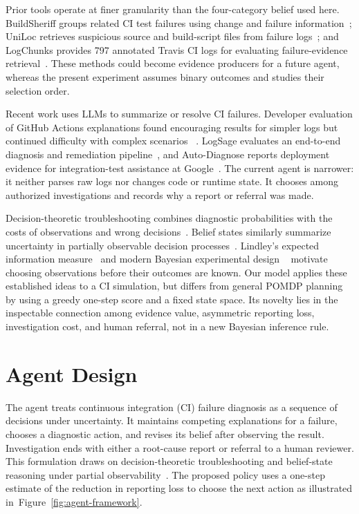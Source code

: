 \documentclass{article}
\begin{document}
Prior tools operate at finer granularity than the four-category belief used
here. BuildSheriff groups related CI test failures using change and failure
information~\cite{Zhang2022BuildSheriff}; UniLoc retrieves suspicious source
and build-script files from failure logs~\cite{Hassan2023UniLoc}; and LogChunks
provides 797 annotated Travis CI logs for evaluating failure-evidence
retrieval~\cite{Brandt2020LogChunks}. These methods could become evidence
producers for a future agent, whereas the present experiment assumes binary
outcomes and studies their selection order.

Recent work uses LLMs to summarize or resolve CI failures. Developer evaluation
of GitHub Actions explanations found encouraging results for simpler logs but
continued difficulty with complex scenarios
~\cite{ValenzuelaToledo2025GHAFailures}. LogSage evaluates an end-to-end
diagnosis and remediation pipeline~\cite{Xu2025LogSage}, and Auto-Diagnose
reports deployment evidence for integration-test assistance at
Google~\cite{Ziftci2026AutoDiagnose}. The current agent is narrower: it neither
parses raw logs nor changes code or runtime state. It chooses among authorized
investigations and records why a report or referral was made.

Decision-theoretic troubleshooting combines diagnostic probabilities with the
costs of observations and wrong decisions~\cite{Heckerman1995Troubleshooting}.
Belief states similarly summarize uncertainty in partially observable
decision processes~\cite{Kaelbling1998POMDP}. Lindley's expected information
measure~\cite{Lindley1956Information} and modern Bayesian experimental design
~\cite{Rainforth2024ExperimentalDesign} motivate choosing observations before
their outcomes are known. Our model applies these established ideas to a CI
simulation, but differs from general POMDP planning by using a greedy one-step
score and a fixed state space. Its novelty lies in the inspectable connection
among evidence value, asymmetric reporting loss, investigation cost, and
human referral, not in a new Bayesian inference rule.

\section{Agent Design}
\label{sec:agent_design}

The agent treats continuous integration (CI) failure diagnosis as a sequence
of decisions under uncertainty. It maintains competing explanations for a
failure, chooses a diagnostic action, and revises its belief after observing
the result. Investigation ends with either a root-cause report or referral
to a human reviewer. This formulation draws on decision-theoretic
troubleshooting and belief-state reasoning
under partial observability~\cite{Heckerman1995Troubleshooting,Kaelbling1998POMDP}.
The proposed policy
uses a one-step estimate of the reduction in reporting loss to choose the
next action as illustrated in~Figure~\ref{fig:agent-framework}.
\end{document}
